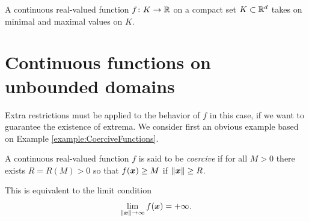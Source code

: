 \begin{theorem}\label{theorem:EVT}
A continuous real-valued function $f \colon K \to \mathbb{R}$ on a compact set $K \subset \mathbb{R}^d$ takes on minimal and maximal values on $K$.
\end{theorem}

\section{Continuous functions on unbounded domains}
Extra restrictions must be applied to the behavior of $f$ in this case, if we want to guarantee the existence of extrema. We consider first an obvious example based on Example \ref{example:CoerciveFunctions}.

\begin{definition}\label{def:coerciveFunctions}
A continuous real-valued function $f$ is said to be \emph{coercive} if for all $M>0$ there exists $R=R(M)>0$ so that $f(\boldsymbol{x})\geq M$ if $\lVert \boldsymbol{x} \rVert\geq R$.
\end{definition}

\begin{remark}
This is equivalent to the limit condition  
\begin{equation*}
\lim_{\lVert \boldsymbol{x} \rVert\to \infty} f(\boldsymbol{x}) = +\infty.
\end{equation*}
\end{remark}


